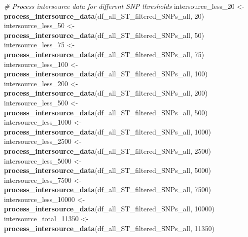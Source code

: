 \documentclass[
]{article}
\newenvironment{Shaded}{\begin{snugshade}}{\end{snugshade}}
\newcommand{\CommentTok}[1]{\textcolor[rgb]{0.56,0.35,0.01}{\textit{#1}}}
\newcommand{\DecValTok}[1]{\textcolor[rgb]{0.00,0.00,0.81}{#1}}
\newcommand{\FunctionTok}[1]{\textcolor[rgb]{0.13,0.29,0.53}{\textbf{#1}}}
\newcommand{\NormalTok}[1]{#1}
\newcommand{\OtherTok}[1]{\textcolor[rgb]{0.56,0.35,0.01}{#1}}
\begin{document}
\begin{Shaded}
\begin{Highlighting}[]
\CommentTok{\# Process intersource data for different SNP thresholds}
\NormalTok{intersource\_less\_20 }\OtherTok{\textless{}{-}} \FunctionTok{process\_intersource\_data}\NormalTok{(df\_all\_ST\_filtered\_SNPs\_all, }\DecValTok{20}\NormalTok{)}
\NormalTok{intersource\_less\_50 }\OtherTok{\textless{}{-}} \FunctionTok{process\_intersource\_data}\NormalTok{(df\_all\_ST\_filtered\_SNPs\_all, }\DecValTok{50}\NormalTok{)}
\NormalTok{intersource\_less\_75 }\OtherTok{\textless{}{-}} \FunctionTok{process\_intersource\_data}\NormalTok{(df\_all\_ST\_filtered\_SNPs\_all, }\DecValTok{75}\NormalTok{)}
\NormalTok{intersource\_less\_100 }\OtherTok{\textless{}{-}} \FunctionTok{process\_intersource\_data}\NormalTok{(df\_all\_ST\_filtered\_SNPs\_all, }\DecValTok{100}\NormalTok{)}
\NormalTok{intersource\_less\_200 }\OtherTok{\textless{}{-}} \FunctionTok{process\_intersource\_data}\NormalTok{(df\_all\_ST\_filtered\_SNPs\_all, }\DecValTok{200}\NormalTok{)}
\NormalTok{intersource\_less\_500 }\OtherTok{\textless{}{-}} \FunctionTok{process\_intersource\_data}\NormalTok{(df\_all\_ST\_filtered\_SNPs\_all, }\DecValTok{500}\NormalTok{)}
\NormalTok{intersource\_less\_1000 }\OtherTok{\textless{}{-}} \FunctionTok{process\_intersource\_data}\NormalTok{(df\_all\_ST\_filtered\_SNPs\_all, }\DecValTok{1000}\NormalTok{)}
\NormalTok{intersource\_less\_2500 }\OtherTok{\textless{}{-}} \FunctionTok{process\_intersource\_data}\NormalTok{(df\_all\_ST\_filtered\_SNPs\_all, }\DecValTok{2500}\NormalTok{)}
\NormalTok{intersource\_less\_5000 }\OtherTok{\textless{}{-}} \FunctionTok{process\_intersource\_data}\NormalTok{(df\_all\_ST\_filtered\_SNPs\_all, }\DecValTok{5000}\NormalTok{)}
\NormalTok{intersource\_less\_7500 }\OtherTok{\textless{}{-}} \FunctionTok{process\_intersource\_data}\NormalTok{(df\_all\_ST\_filtered\_SNPs\_all, }\DecValTok{7500}\NormalTok{)}
\NormalTok{intersource\_less\_10000 }\OtherTok{\textless{}{-}} \FunctionTok{process\_intersource\_data}\NormalTok{(df\_all\_ST\_filtered\_SNPs\_all, }\DecValTok{10000}\NormalTok{)}
\NormalTok{intersource\_total\_11350 }\OtherTok{\textless{}{-}} \FunctionTok{process\_intersource\_data}\NormalTok{(df\_all\_ST\_filtered\_SNPs\_all, }\DecValTok{11350}\NormalTok{)}


\end{Highlighting}
\end{Shaded}
\end{document}
